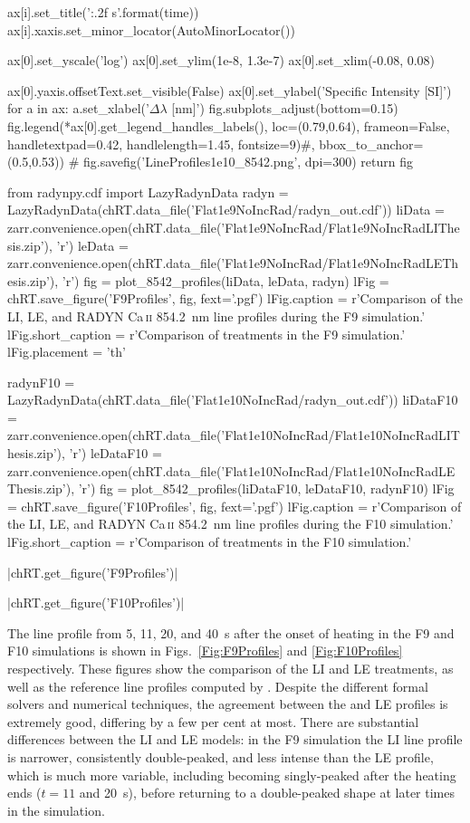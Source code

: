 \begin{pycode}[TimeDepRT]
        ax[i].set_title('{:.2f} s'.format(time))
        ax[i].xaxis.set_minor_locator(AutoMinorLocator())

    ax[0].set_yscale('log')
    ax[0].set_ylim(1e-8, 1.3e-7)
    ax[0].set_xlim(-0.08, 0.08)

    ax[0].yaxis.offsetText.set_visible(False)
    ax[0].set_ylabel('Specific Intensity [SI]')
    for a in ax:
        a.set_xlabel('$\Delta\lambda$ [nm]')
    fig.subplots_adjust(bottom=0.15)
    fig.legend(*ax[0].get_legend_handles_labels(), loc=(0.79,0.64), frameon=False,
               handletextpad=0.42, handlelength=1.45, fontsize=9)#, bbox_to_anchor=(0.5,0.53))
#     fig.savefig('LineProfiles1e10_8542.png', dpi=300)
    return fig

from radynpy.cdf import LazyRadynData
radyn = LazyRadynData(chRT.data_file('Flat1e9NoIncRad/radyn_out.cdf'))
liData = zarr.convenience.open(chRT.data_file('Flat1e9NoIncRad/Flat1e9NoIncRadLIThesis.zip'), 'r')
leData = zarr.convenience.open(chRT.data_file('Flat1e9NoIncRad/Flat1e9NoIncRadLEThesis.zip'), 'r')
fig = plot_8542_profiles(liData, leData, radyn)
lFig = chRT.save_figure('F9Profiles', fig, fext='.pgf')
lFig.caption = r'Comparison of the LI, LE, and RADYN Ca\,\textsc{ii} \SI{854.2}{\nano\metre} line profiles during the F9 simulation.'
lFig.short_caption = r'Comparison of \CaLine{} treatments in the F9 simulation.'
lFig.placement = 'th'

radynF10 = LazyRadynData(chRT.data_file('Flat1e10NoIncRad/radyn_out.cdf'))
liDataF10 = zarr.convenience.open(chRT.data_file('Flat1e10NoIncRad/Flat1e10NoIncRadLIThesis.zip'), 'r')
leDataF10 = zarr.convenience.open(chRT.data_file('Flat1e10NoIncRad/Flat1e10NoIncRadLEThesis.zip'), 'r')
fig = plot_8542_profiles(liDataF10, leDataF10, radynF10)
lFig = chRT.save_figure('F10Profiles', fig, fext='.pgf')
lFig.caption = r'Comparison of the LI, LE, and RADYN Ca\,\textsc{ii} \SI{854.2}{\nano\metre} line profiles during the F10 simulation.'
lFig.short_caption = r'Comparison of \CaLine{} treatments in the F10 simulation.'
\end{pycode}
\py[TimeDepRT]|chRT.get_figure('F9Profiles')|

\py[TimeDepRT]|chRT.get_figure('F10Profiles')|

The \CaLine{} line profile from 5, 11, 20, and \SI{40}{\second} after the onset of heating in the F9 and F10 simulations is shown in Figs.~\ref{Fig:F9Profiles} and \ref{Fig:F10Profiles} respectively.
These figures show the comparison of the LI and LE treatments, as well as the reference line profiles computed by \Radyn{}.
Despite the different formal solvers and numerical techniques, the agreement between the \Radyn{} and LE profiles is extremely good, differing by a few per cent at most.
There are substantial differences between the LI and LE models: in the F9 simulation the LI line profile is narrower, consistently double-peaked, and less intense than the LE profile, which is much more variable, including becoming singly-peaked after the heating ends ($t=11$ and \SI{20}{\second}), before returning to a double-peaked shape at later times in the simulation.

